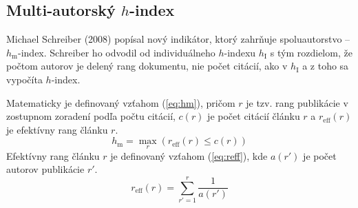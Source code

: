 \subsection{Multi-autorský $h$-index}

Michael Schreiber (2008) popísal nový indikátor, ktorý zahrňuje spoluautorstvo
-- $h_{\mathrm{m}}$-index. Schreiber ho odvodil od individuálneho $h$-indexu
$h_{\mathrm{I}}$ s tým rozdielom, že počtom autorov je delený rang dokumentu,
nie počet citácií, ako v $h_{\mathrm{I}}$ a z toho sa vypočíta $h$-index.

Matematicky je definovaný vzťahom (\ref{eq:hm}), pričom $r$ je tzv. rang
publikácie v zostupnom zoradení podľa počtu citácií, $c(r)$ je počet citácií
článku $r$ a $r_{\mathrm{eff}}(r)$ je efektívny rang článku $r$.
\begin{equation}
\label{eq:hm}
h_{\mathrm{m}} = \max_r{(r_{\mathrm{eff}}(r) \leq c(r))}
\end{equation}
Efektívny rang článku $r$ je definovaný vzťahom (\ref{eq:reff}), kde $a(r')$ je
počet autorov publikácie $r'$.
\begin{equation}
\label{eq:reff}
r_{\mathrm{eff}}(r) = \sum_{r'=1}^r{\frac{1}{a(r')}}
\end{equation}


